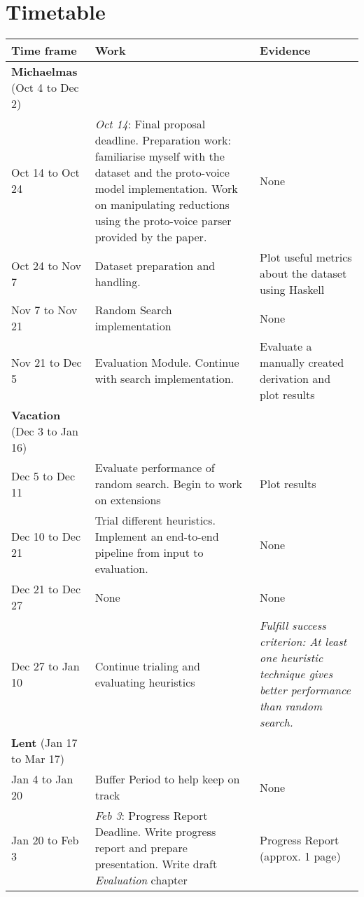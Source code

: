 \documentclass{article}
\begin{document}
\section{Timetable}
\setlength{\extrarowheight}{.4em}
\begin{tabularx}{\textwidth}{@{}l  p{180pt} p{110pt} @{}}
  \toprule
  Time frame       & Work & Evidence   \\ 
  \midrule
  \textbf{Michaelmas} (Oct 4 to Dec 2)  & &    \\ 
  Oct 14 to Oct 24 & \textit{Oct 14}: Final proposal deadline.
                      Preparation work: familiarise myself with the dataset and the proto-voice model implementation.   
                      Work on manipulating reductions using the proto-voice parser provided by the paper. & None       \\
  Oct 24 to Nov 7 &  Dataset preparation and handling. & Plot useful metrics about the dataset using Haskell        \\
  Nov 7 to Nov 21 &  Random Search implementation &   None     \\
  Nov 21 to Dec 5 &  Evaluation Module. Continue with search implementation. & Evaluate a manually created derivation and plot results \\
  \midrule
  \textbf{Vacation} (Dec 3 to Jan 16)  & &    \\ 
  Dec 5 to Dec 11 &  Evaluate performance of random search. Begin to work on extensions & Plot results       \\
  Dec 10 to Dec 21 &  Trial different heuristics. Implement an end-to-end pipeline from input to evaluation. & None    \\
  Dec 21 to Dec 27 &  None & None    \\
  Dec 27 to Jan 10 &  Continue trialing and evaluating heuristics & \textit{Fulfill success criterion: At least one heuristic technique gives better performance than random search.}\\
  \midrule
  \textbf{Lent} (Jan 17 to  Mar 17)   &  &    \\ 
  Jan 4 to Jan 20 &  Buffer Period to help keep on track& None       \\
  Jan 20 to Feb 3 
                  &
                \textit{Feb 3}: Progress Report Deadline.
                  Write progress report and prepare presentation. 
                  Write draft \textit{Evaluation} chapter  & Progress Report (approx. 1 page)      \\


\end{tabularx}
\end{document}
